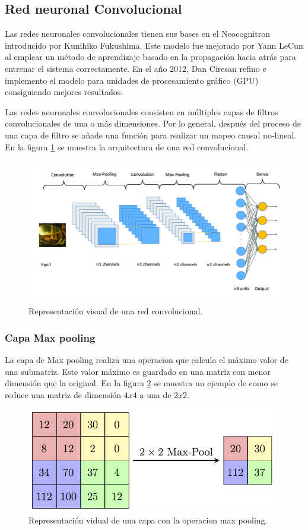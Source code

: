 \subsection{Red neuronal Convolucional}

Las redes neuronales convolucionales tienen sus bases en el Neocognitron introducido por  Kunihiko Fukushima\cite{Fukushima_1980}. Este modelo fue mejorado por Yann LeCun\cite{Lecun_1998} al emplear un método de aprendizaje basado en la propagación hacia atrás para entrenar el sistema correctamente. En el año 2012, Dan Ciresan refino e implemento el modelo para unidades de procesamiento gráfico (GPU) consiguiendo mejores resultados\cite{Cirecsan_2011}.

Las redes neuronales convolucionales consisten en múltiples capas de filtros convolucionales de una o más dimensiones. Por lo general, después del proceso de una capa de filtro se añade una función para realizar un mapeo causal no-lineal. En la figura \ref{fig:CNN} se muestra la arquitectura de una red convolucional.

\begin{figure}[H]
    \centering
    \includegraphics[width=15cm]{Graphics/convolutional.png}
    \caption{Representación visual de una red convolucional\cite{Garcia_2020}.}
    \label{fig:CNN}
\end{figure}

\subsubsection{Capa Max pooling}

La capa de Max pooling realiza una operacion que calcula el máximo valor de una submatriz. Este valor máximo es guardado en una matriz con menor dimensión que la original. En la figura \ref{fig:max_pooling} se muestra un ejemplo de como se reduce una matriz de dimensión $4x4$ a una de $2x2$.

\begin{figure}[H]
    \centering
    \includegraphics[width=11cm]{Graphics/max_pooling.png}
    \caption{Representación vidual de una capa con la operacion max pooling.}
    \label{fig:max_pooling}
\end{figure}